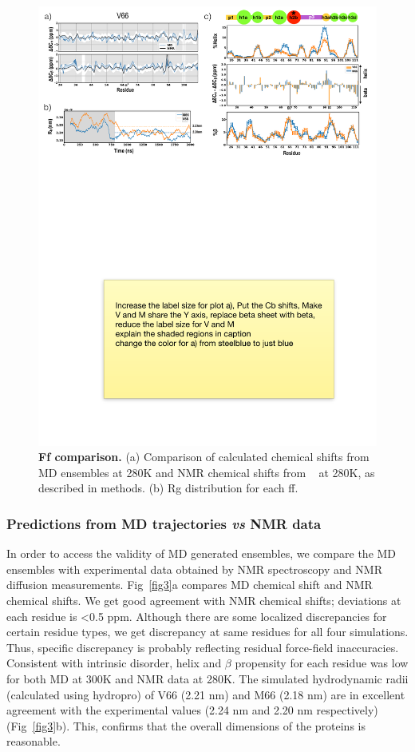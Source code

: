 \documentclass[10pt,letterpaper]{article}
\begin{document}
 \begin{figure}[!ht]
\includegraphics[scale=0.5,width=\textwidth,trim={0 0cm 0 0cm},clip]{../figures/fig2.pdf}
\caption{{\bf Ff comparison.} (a) Comparison of calculated chemical shifts from MD ensembles at 280K and NMR chemical shifts from ~\cite{Anastasia2013}  at 280K,  as described in methods. (b) Rg distribution for each ff.}
\label{fig2} 
\end{figure}

\subsubsection*{Predictions from MD trajectories {\it vs} NMR data} 

In order to access the validity of MD generated ensembles, we compare the MD ensembles with experimental data obtained by NMR spectroscopy and NMR diffusion measurements. Fig~\ref{fig3}a compares MD chemical shift and NMR chemical shifts. We get good agreement with NMR chemical shifts; deviations at each residue is \textless 0.5 ppm. Although there are some localized discrepancies for certain residue types, we get discrepancy at same residues for all four simulations. Thus, specific discrepancy is probably reflecting residual force-field inaccuracies. Consistent with intrinsic disorder, helix and $\beta$ propensity for each residue was low for both MD at 300K and NMR data at 280K. The simulated hydrodynamic radii (calculated using hydropro) of V66 (2.21 nm) and M66 (2.18 nm) are in excellent agreement with the experimental values (2.24 nm and 2.20 nm respectively) (Fig~\ref{fig3}b). This, confirms that the overall dimensions of the proteins is reasonable.
\end{document}
